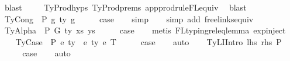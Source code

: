 \begin{isabellebody}
\ blast\isanewline
\ \ \ \isamarkupfalse%
\ TyProd{\isachardot}{\kern0pt}hyps{\isacharparenleft}{\kern0pt}{}{\isacharparenright}{\kern0pt}\ TyProd{\isachardot}{\kern0pt}prems\ app{\isacharunderscore}{\kern0pt}prodrule{\isacharunderscore}{\kern0pt}FL{\isacharunderscore}{\kern0pt}equiv\ \isamarkupfalse%
\ blast\isanewline
{}\isamarkupfalse%
\isanewline
\ \ \isamarkupfalse%
\ {\isacharparenleft}{\kern0pt}TyCong\ {\isasymGamma}\ P\ g{}\ ty\ g{}{\isacharparenright}{\kern0pt}\isanewline
\ \ \isamarkupfalse%
\ \isamarkupfalse%
\ {\isacharquery}{\kern0pt}case\isanewline
\ \ \isamarkupfalse%
\ simp\isanewline
\ \ \isamarkupfalse%
\ {\isacharparenleft}{\kern0pt}simp\ add{\isacharcolon}{\kern0pt}\ freelinks{\isacharunderscore}{\kern0pt}equiv{\isacharparenright}{\kern0pt}\isanewline
{}\isamarkupfalse%
\isanewline
\ \ \isamarkupfalse%
\ {\isacharparenleft}{\kern0pt}TyAlpha\ {\isasymGamma}{}\ P\ G\ ty\ xs\ ys{\isacharparenright}{\kern0pt}\isanewline
\ \ \isamarkupfalse%
\ \isamarkupfalse%
\ {\isacharquery}{\kern0pt}case\isanewline
\ \ \isamarkupfalse%
\ {\isacharparenleft}{\kern0pt}metis\ FL{\isacharunderscore}{\kern0pt}typing{\isacharunderscore}{\kern0pt}rel{\isacharunderscore}{\kern0pt}eq{\isacharunderscore}{\kern0pt}lemma{}\ exp{\isachardot}{\kern0pt}inject{\isacharparenleft}{\kern0pt}{}{\isacharparenright}{\kern0pt}{\isacharparenright}{\kern0pt}\isanewline
{}\isamarkupfalse%
\isanewline
\ \ \isamarkupfalse%
\ {\isacharparenleft}{\kern0pt}TyCase\ {\isasymGamma}\ P\ e{}\ ty{}\ {\isasymGamma}{}\ e{}\ ty{}\ e{}\ T{\isacharparenright}{\kern0pt}\isanewline
\ \ \isamarkupfalse%
\ \isamarkupfalse%
\ {\isacharquery}{\kern0pt}case\isanewline
\ \ \isamarkupfalse%
\ auto\isanewline
{}\isamarkupfalse%
\isanewline
\ \ \isamarkupfalse%
\ {\isacharparenleft}{\kern0pt}TyLIIntro\ lhs\ rhs\ P\ {\isasymGamma}{\isacharparenright}{\kern0pt}\isanewline
\ \ \isamarkupfalse%
\ \isamarkupfalse%
\ {\isacharquery}{\kern0pt}case\isanewline
\ \ \isamarkupfalse%
\ auto\isanewline
\ \ \isamarkupfalse%

\end{isabellebody}
